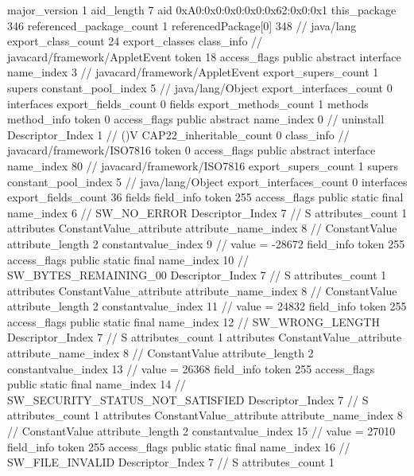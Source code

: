 {{{			major_version	1
			aid_length	7
			aid	0xA0:0x0:0x0:0x0:0x62:0x0:0x1
		}
	}
	this_package	346
	referenced_package_count	1
	referencedPackage[0]	348		// java/lang
	export_class_count	24
	export_classes {
		class_info {		// javacard/framework/AppletEvent
			token	18
			access_flags	public abstract interface
			name_index	3		// javacard/framework/AppletEvent
			export_supers_count	1
			supers {
				constant_pool_index	5		// java/lang/Object
			}
			export_interfaces_count	0
			interfaces {
			}
			export_fields_count	0
			fields {
			}
			export_methods_count	1
			methods {
				method_info {
					token	0
					access_flags	public abstract
					name_index	0		// uninstall
					Descriptor_Index	1		// ()V
				}
			}
			CAP22_inheritable_count	0
		}
		class_info {		// javacard/framework/ISO7816
			token	0
			access_flags	public abstract interface
			name_index	80		// javacard/framework/ISO7816
			export_supers_count	1
			supers {
				constant_pool_index	5		// java/lang/Object
			}
			export_interfaces_count	0
			interfaces {
			}
			export_fields_count	36
			fields {
			field_info {
				token	255
				access_flags	public static final
				name_index	6		// SW_NO_ERROR
				Descriptor_Index	7		// S
				attributes_count	1
				attributes {
				ConstantValue_attribute {
					attribute_name_index	8		// ConstantValue
					attribute_length	2
					constantvalue_index	9		// value = -28672
				}
				}
			}
			field_info {
				token	255
				access_flags	public static final
				name_index	10		// SW_BYTES_REMAINING_00
				Descriptor_Index	7		// S
				attributes_count	1
				attributes {
				ConstantValue_attribute {
					attribute_name_index	8		// ConstantValue
					attribute_length	2
					constantvalue_index	11		// value = 24832
				}
				}
			}
			field_info {
				token	255
				access_flags	public static final
				name_index	12		// SW_WRONG_LENGTH
				Descriptor_Index	7		// S
				attributes_count	1
				attributes {
				ConstantValue_attribute {
					attribute_name_index	8		// ConstantValue
					attribute_length	2
					constantvalue_index	13		// value = 26368
				}
				}
			}
			field_info {
				token	255
				access_flags	public static final
				name_index	14		// SW_SECURITY_STATUS_NOT_SATISFIED
				Descriptor_Index	7		// S
				attributes_count	1
				attributes {
				ConstantValue_attribute {
					attribute_name_index	8		// ConstantValue
					attribute_length	2
					constantvalue_index	15		// value = 27010
				}
				}
			}
			field_info {
				token	255
				access_flags	public static final
				name_index	16		// SW_FILE_INVALID
				Descriptor_Index	7		// S
				attributes_count	1
}}}}}
